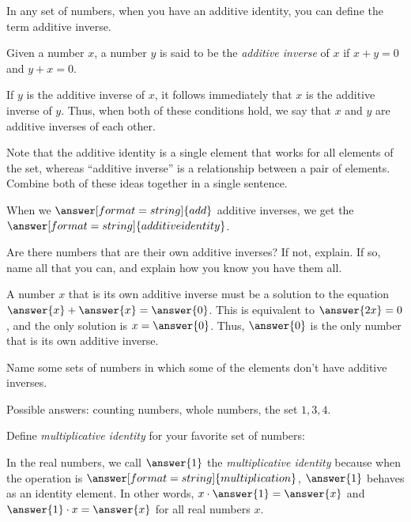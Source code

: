 \documentclass[space,nooutcomes]{ximera}
\begin{document}
In any set of numbers, when you have an additive identity,
you can define the term additive inverse.  

\begin{definition}
Given a number $x$, a number $y$ is said to be the \emph{additive
  inverse} of $x$ if $x+y=0$ and $y+x=0$.  
\end{definition}

If $y$ is the additive inverse of $x$, it follows immediately that
$x$ is the additive inverse of $y$.  Thus, when both of these
conditions hold, we say that $x$ and $y$ are additive inverses of each
other.

\begin{question}
Note that the additive identity is a single element that works for
all elements of the set, whereas ``additive inverse'' is a
relationship between a pair of elements.  Combine both of these ideas
together in a single sentence.  

\begin{solution}
When we $\answer[format=string]{add}$ additive inverses, we get the
$\answer[format=string]{additive identity}$.
\end{solution}
\end{question}

\begin{question}
Are there numbers that are their own additive inverses?  If not,
explain.  If so, name all that you can, and explain how you know you
have them all.

\begin{solution}
A number $x$ that is its own additive inverse must be a solution to
the equation $\answer{x}+\answer{x} = \answer{0}$.  This is equivalent to $\answer{2x}=0$, and the only
solution is $x=\answer{0}$.  Thus, $\answer{0}$ is the only number that is its own
additive inverse.
\end{solution}
\end{question}

\begin{question}
Name some sets of numbers in which some of the elements don't have
additive inverses.
\begin{freeResponse}
\begin{hint}
Possible answers: counting numbers, whole numbers, the set ${1, 3,
  4}$.
\end{hint}
\end{freeResponse}
\end{question}

\begin{question}Define \emph{multiplicative identity} for your favorite set of numbers: 
\begin{solution}
In the real numbers, we call $\answer{1}$ the \emph{multiplicative identity} because when the operation is 
$\answer[format=string]{multiplication}$,  
$\answer{1}$ behaves as an identity element.  
In other words, $x\cdot \answer{1}=\answer{x}$ and $\answer{1}\cdot x=\answer{x}$ for all real numbers $x$.  
\end{solution}
\end{question}
\end{document}
